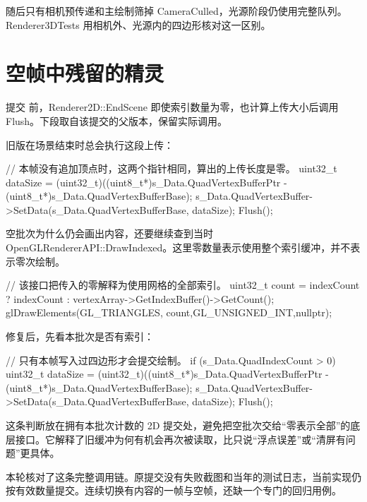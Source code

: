 随后只有相机预传递和主绘制筛掉 CameraCulled，光源阶段仍使用完整队列。Renderer3DTests 用相机外、光源内的四边形核对这一区别。

\newpage
\section{空帧中残留的精灵}
提交  前，Renderer2D::EndScene 即使索引数量为零，也计算上传大小后调用 Flush。下段取自该提交的父版本，保留实际调用。

旧版在场景结束时总会执行这段上传：
\begin{Code}
// 本帧没有追加顶点时，这两个指针相同，算出的上传长度是零。
uint32_t dataSize = (uint32_t)((uint8_t*)s_Data.QuadVertexBufferPtr -
    (uint8_t*)s_Data.QuadVertexBufferBase);
s_Data.QuadVertexBuffer->SetData(s_Data.QuadVertexBufferBase, dataSize);
Flush();
\end{Code}

空批次为什么仍会画出内容，还要继续查到当时 OpenGLRendererAPI::DrawIndexed。这里零数量表示使用整个索引缓冲，并不表示零次绘制。
\begin{Code}
// 该接口把传入的零解释为使用网格的全部索引。
uint32_t count = indexCount ? indexCount : vertexArray->GetIndexBuffer()->GetCount();
glDrawElements(GL_TRIANGLES, count,GL_UNSIGNED_INT,nullptr);
\end{Code}

修复后，先看本批次是否有索引：
\begin{Code}
// 只有本帧写入过四边形才会提交绘制。
if (s_Data.QuadIndexCount > 0)
{
    uint32_t dataSize = (uint32_t)((uint8_t*)s_Data.QuadVertexBufferPtr -
        (uint8_t*)s_Data.QuadVertexBufferBase);
    s_Data.QuadVertexBuffer->SetData(s_Data.QuadVertexBufferBase, dataSize);
    Flush();
}
\end{Code}

这条判断放在拥有本批次计数的 2D 提交处，避免把空批次交给“零表示全部”的底层接口。它解释了旧缓冲为何有机会再次被读取，比只说“浮点误差”或“清屏有问题”更具体。

本轮核对了这条完整调用链。原提交没有失败截图和当年的测试日志，当前实现仍按有效数量提交。连续切换有内容的一帧与空帧，还缺一个专门的回归用例。
